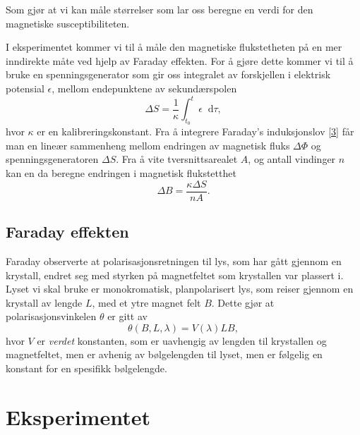 \documentclass[%
 reprint,
 amsmath,amssymb,
 aps,
]{revtex4-1}
\newcommand*\diff{\mathop{}\!\mathrm{d}}
\begin{document}
Som gjør at vi kan måle størrelser som lar oss beregne en verdi for den magnetiske susceptibiliteten.
\par
I eksperimentet kommer vi til å måle den magnetiske flukstetheten på en mer inndirekte måte ved hjelp av Faraday effekten. For å gjøre dette kommer vi til å bruke en spenningsgenerator som gir oss integralet av forskjellen i elektrisk potensial $\epsilon$, mellom endepunktene av sekundærspolen
\begin{equation}
  \Delta S = \frac{1}{\kappa}\int_{t_0}^{t}\epsilon \diff \tau, \label{deltas}
\end{equation}
hvor $\kappa$ er en kalibreringskonstant. Fra å integrere Faraday's induksjonslov \eqref{3} får man en lineær sammenheng mellom endringen av magnetisk fluks $\Delta \Phi$ og spenningsgeneratoren $\Delta S$. Fra å vite tversnittsarealet $A$, og antall vindinger $n$ kan en da beregne endringen i magnetisk flukstetthet
\begin{equation}
  \Delta B = \frac{\kappa\Delta S}{nA}.\label{deltab}
\end{equation}
\subsection{Faraday effekten}
Faraday observerte at polarisasjonsretningen til lys, som har gått gjennom en krystall, endret seg
med styrken på magnetfeltet som krystallen var plassert i. Lyset vi skal bruke er monokromatisk, planpolarisert lys, som reiser gjennom en krystall av lengde $L$, med et ytre magnet felt $B$. Dette gjør at polarisasjonsvinkelen $\theta$ er gitt av
\begin{equation}
  \theta\left(B, L, \lambda\right) = V\left(\lambda\right)LB,\label{verdet}
\end{equation}
hvor $V$ er \textit{verdet} konstanten, som er uavhengig av lengden til krystallen og magnetfeltet, men er avhenig av bølgelengden til lyset, men er følgelig en konstant for en spesifikk bølgelengde.
\section{\label{sec:level3}Eksperimentet}
\end{document}
